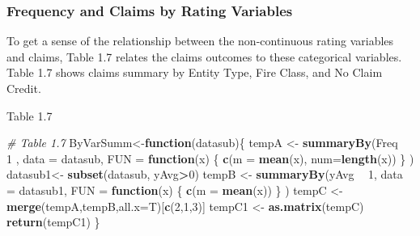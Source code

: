 \documentclass[]{book}
\newenvironment{Shaded}{\begin{snugshade}}{\end{snugshade}}
\newcommand{\KeywordTok}[1]{\textcolor[rgb]{0.13,0.29,0.53}{\textbf{#1}}}
\newcommand{\DataTypeTok}[1]{\textcolor[rgb]{0.13,0.29,0.53}{#1}}
\newcommand{\DecValTok}[1]{\textcolor[rgb]{0.00,0.00,0.81}{#1}}
\newcommand{\StringTok}[1]{\textcolor[rgb]{0.31,0.60,0.02}{#1}}
\newcommand{\CommentTok}[1]{\textcolor[rgb]{0.56,0.35,0.01}{\textit{#1}}}
\newcommand{\ControlFlowTok}[1]{\textcolor[rgb]{0.13,0.29,0.53}{\textbf{#1}}}
\newcommand{\OperatorTok}[1]{\textcolor[rgb]{0.81,0.36,0.00}{\textbf{#1}}}
\newcommand{\NormalTok}[1]{#1}
\theoremstyle{definition}
\theoremstyle{definition}
\theoremstyle{definition}
\theoremstyle{remark}
\begin{document}
\subsubsection{Frequency and Claims by Rating
Variables}\label{frequency-and-claims-by-rating-variables}

To get a sense of the relationship between the non-continuous rating
variables and claims, Table 1.7 relates the claims outcomes to these
categorical variables. Table 1.7 shows claims summary by Entity Type,
Fire Class, and No Claim Credit.

Table 1.7

\begin{Shaded}
\begin{Highlighting}[]
\CommentTok{# Table 1.7}
\NormalTok{ByVarSumm<-}\ControlFlowTok{function}\NormalTok{(datasub)\{}
\NormalTok{  tempA <-}\StringTok{ }\KeywordTok{summaryBy}\NormalTok{(Freq    }\OperatorTok{~}\StringTok{ }\DecValTok{1}\NormalTok{ , }\DataTypeTok{data =}\NormalTok{ datasub,   }
                     \DataTypeTok{FUN =} \ControlFlowTok{function}\NormalTok{(x) \{ }\KeywordTok{c}\NormalTok{(}\DataTypeTok{m =} \KeywordTok{mean}\NormalTok{(x), }\DataTypeTok{num=}\KeywordTok{length}\NormalTok{(x)) \} )}
\NormalTok{  datasub1<-}\StringTok{  }\KeywordTok{subset}\NormalTok{(datasub, yAvg}\OperatorTok{>}\DecValTok{0}\NormalTok{)}
\NormalTok{  tempB <-}\StringTok{ }\KeywordTok{summaryBy}\NormalTok{(yAvg   }\OperatorTok{~}\StringTok{ }\DecValTok{1}\NormalTok{, }\DataTypeTok{data =}\NormalTok{ datasub1,}
                     \DataTypeTok{FUN =} \ControlFlowTok{function}\NormalTok{(x) \{ }\KeywordTok{c}\NormalTok{(}\DataTypeTok{m =} \KeywordTok{mean}\NormalTok{(x)) \} )}
\NormalTok{  tempC <-}\StringTok{ }\KeywordTok{merge}\NormalTok{(tempA,tempB,}\DataTypeTok{all.x=}\NormalTok{T)[}\KeywordTok{c}\NormalTok{(}\DecValTok{2}\NormalTok{,}\DecValTok{1}\NormalTok{,}\DecValTok{3}\NormalTok{)]}
\NormalTok{  tempC1 <-}\StringTok{ }\KeywordTok{as.matrix}\NormalTok{(tempC)}
  \KeywordTok{return}\NormalTok{(tempC1)}
\NormalTok{\}}


\end{Highlighting}
\end{Shaded}
\end{document}
